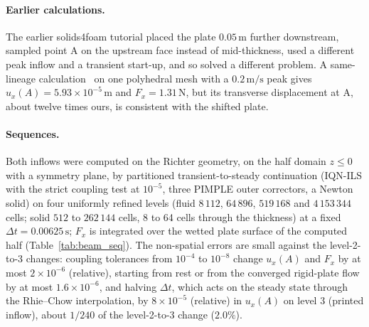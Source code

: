 \documentclass[sn-mathphys,Numbered]{sn-jnl}%
\begin{document}
\begin{appendices}
\paragraph{Earlier calculations.}
The earlier solids4foam tutorial placed the plate $0.05\,\mathrm{m}$ further downstream, sampled point A on the upstream face instead of mid-thickness, used a different peak inflow and a transient start-up, and so solved a different problem. A same-lineage calculation~\citep{Tukovic2018} on one polyhedral mesh with a $0.2\,\mathrm{m/s}$ peak gives $u_x(A) = 5.93\times10^{-5}\,\mathrm{m}$ and $F_x = 1.31\,\mathrm{N}$, but its transverse displacement at A, about twelve times ours, is consistent with the shifted plate.

\paragraph{Sequences.}
Both inflows were computed on the Richter geometry, on the half domain $z \le 0$ with a symmetry plane, by partitioned transient-to-steady continuation (IQN-ILS with the strict coupling test at $10^{-5}$, three PIMPLE outer correctors, a Newton solid) on four uniformly refined levels (fluid $8\,112$, $64\,896$, $519\,168$ and $4\,153\,344$ cells; solid $512$ to $262\,144$ cells, 8 to 64 cells through the thickness) at a fixed $\Delta t = 0.00625\,\mathrm{s}$; $F_x$ is integrated over the wetted plate surface of the computed half (Table~\ref{tab:beam_seq}).
The non-spatial errors are small against the level-2-to-3 changes: coupling tolerances from $10^{-4}$ to $10^{-8}$ change $u_x(A)$ and $F_x$ by at most $2\times10^{-6}$ (relative), starting from rest or from the converged rigid-plate flow by at most $1.6\times10^{-6}$, and halving $\Delta t$, which acts on the steady state through the Rhie--Chow interpolation, by $8\times10^{-5}$ (relative) in $u_x(A)$ on level 3 (printed inflow), about $1/240$ of the level-2-to-3 change ($2.0\%$).


\end{appendices}
\end{document}
